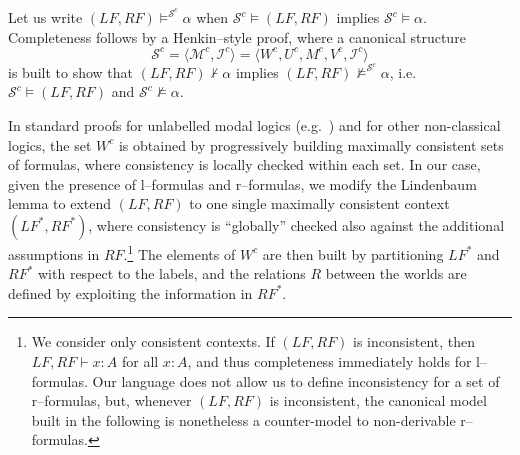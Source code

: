 \documentclass[times, 10pt]{article}
\newcommand{\LF}{\mathit{LF}}
\newcommand{\RF}{\mathit{RF}}
\newcommand{\I}{\mathscr{I}}
\begin{document}
Let us write $(\LF,\RF) \vDash^{\mathscr{S}^c} \alpha$ when 
$\mathscr{S}^c \vDash (\LF,\RF)$ implies $\mathscr{S}^c \vDash \alpha$. 
Completeness follows by a Henkin--style proof, where a canonical structure
\begin{displaymath}
\mathscr{S}^c = \langle \mathscr{M}^c, \I^c \rangle = 
\langle W^c, U^c, M^c, V^c, \I^c \rangle
\end{displaymath}
is built to show that $(\LF,\RF) \nvdash \alpha$ implies 
$(\LF,\RF) \nvDash^{\mathscr{S}^c} \alpha$, 
i.e.~$\mathscr{S}^c \vDash (\LF,\RF)$ and $\mathscr{S}^c \nvDash \alpha$.

In standard proofs for unlabelled modal logics (e.g.~\cite{Chellas80}) and for other non-classical 
logics, the set $W^c$ is obtained by progressively building maximally
consistent sets of formulas, where consistency is locally checked
within each set.  In our case, given the presence of l--formulas and r--formulas, we modify the Lindenbaum lemma to extend $(\LF,\RF)$ to one single maximally consistent context 
$(\LF^*,\RF^*)$, where consistency is ``globally'' checked also against the additional
assumptions in $\RF$.\footnote{We consider only consistent contexts.  If $(\LF,\RF)$ is 
inconsistent, then $\LF, \RF \vdash x:A$ for all $x:A$, and thus completeness immediately holds 
for l--formulas.  Our language does not allow us to define inconsistency for a set of r--formulas, but, whenever $(\LF,\RF)$ is inconsistent, the canonical model built in the following is nonetheless a counter-model to non-derivable r--formulas.} The elements of $W^c$ are then built by partitioning $\LF^*$ and $\RF^*$ with respect to the labels, and the relations $R$ between the worlds are defined by exploiting the information in $\RF^*$.  
\end{document}
